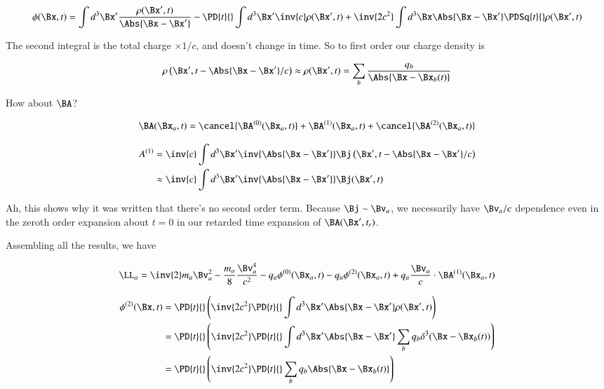 \begin{equation}\label{eqn:relativisticElectrodynamicsL25:270}
\phi(\Bx, t) 
= \int d^3 \Bx' \frac{\rho(\Bx', t)}{\Abs{\Bx - \Bx'}} - \PD{t}{} \int d^3 \Bx' \inv{c} \rho(\Bx', t) 
+
\inv{2 c^2} \int d^3 \Bx \Abs{\Bx - \Bx'} \PDSq{t}{} \rho(\Bx', t) 
\end{equation}

The second integral is the total charge $\times 1/c$, and doesn't change in time.  So to first order our charge density is

\begin{equation}\label{eqn:relativisticElectrodynamicsL25:290}
\rho\left(\Bx', t - \Abs{\Bx - \Bx'}/c\right) \approx \rho(\Bx', t) = \sum_b \frac{q_b}{\Abs{\Bx - \Bx_b(t)}}
\end{equation}


How about $\BA$?

\begin{equation}\label{eqn:relativisticElectrodynamicsL25:310}
\BA(\Bx_a, t) = 
\cancel{\BA^{(0)}(\Bx_a, t)}
+\BA^{(1)}(\Bx_a, t)
+\cancel{\BA^{(2)}(\Bx_a, t)}
\end{equation}

\begin{align*}
A^{(1)} 
&= \inv{c} \int d^3 \Bx' \inv{\Abs{\Bx - \Bx'}} \Bj\left(\Bx', t - \Abs{\Bx - \Bx'}/c\right)  \\
&\approx \inv{c} \int d^3 \Bx' \inv{\Abs{\Bx - \Bx'}} \Bj(\Bx', t)
\end{align*}

Ah, this shows why it was written that there's no second order term.  Because $\Bj \sim \Bv_a$, we necessarily have $\Bv_a/c$ dependence even in the zeroth order expansion about $t=0$ in our retarded time expansion of $\BA(\Bx', t_r)$.

Assembling all the results, we have

\begin{equation}\label{eqn:relativisticElectrodynamicsL25:330}
\LL_a = \inv{2} m_a \Bv_a^2 - \frac{m_a}{8} \frac{\Bv_a^4}{c^2} - q_a \phi^{(0)}(\Bx_a, t) - q_a \phi^{(2)}(\Bx_a, t) + q_a \frac{\Bv_a}{c} \cdot \BA^{(1)}(\Bx_a, t)
\end{equation}

\begin{align*}
\phi^{(2)}(\Bx, t) 
&= \PD{t}{} \left( \inv{2 c^2} \PD{t}{} \int d^3 \Bx' \Abs{\Bx - \Bx'} \rho(\Bx', t) \right) \\
&= \PD{t}{} \left( \inv{2 c^2} \PD{t}{} \int d^3 \Bx' \Abs{\Bx - \Bx'} \sum_b q_b \delta^3(\Bx - \Bx_b(t)) \right) \\
&= \PD{t}{} \left( \inv{2 c^2} \PD{t}{} \sum_b q_b \Abs{\Bx - \Bx_b(t)} \right)
\end{align*}

